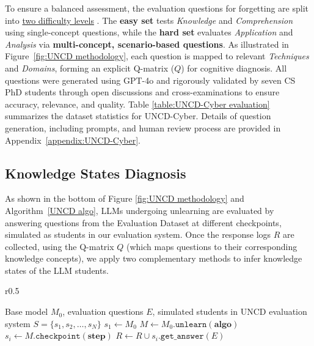 To ensure a balanced assessment, the evaluation questions for forgetting are split into \underline{two difficulty levels} \citep{forehand2010bloom}. The \textbf{easy set} tests \emph{Knowledge} and \emph{Comprehension} using single-concept questions, while the \textbf{hard set} evaluates \emph{Application} and \emph{Analysis} via \textbf{multi-concept, scenario-based questions}. As illustrated in Figure~\ref{fig:UNCD methodology}, each question is mapped to relevant \emph{Techniques} and \emph{Domains}, forming an explicit Q-matrix ($Q$) for cognitive diagnosis. All questions were generated using GPT-4o and rigorously validated by seven CS PhD students through open discussions and cross-examinations to ensure accuracy, relevance, and quality. Table \ref{table:UNCD-Cyber evaluation} summarizes the dataset statistics for UNCD-Cyber. Details of question generation, including prompts, and human review process are provided in Appendix~\ref{appendix:UNCD-Cyber}. 


\subsection{Knowledge States Diagnosis} \vspace{-0.05in}
\label{subsection: CDMs}
As shown in the bottom of Figure \ref{fig:UNCD methodology} and Algorithm~\ref{UNCD algo},  LLMs undergoing unlearning are evaluated by answering questions from the Evaluation Dataset at different checkpoints, simulated as students in our evaluation system. Once  the response logs \(R\) are collected, using the Q-matrix \(Q\) (which maps questions to their corresponding knowledge concepts), we apply two complementary methods to infer knowledge states of the LLM students. 

\begin{wrapfigure}{r}{0.5\textwidth}
 \vspace{-40pt}
  \begin{minipage}{0.5\textwidth}
    \begin{algorithm}[H]
    \small
    \caption{UNCD Response Logs Collection}
    \label{UNCD algo}
    \begin{algorithmic}[1]
    \Require Base model \(M_0\), evaluation questions \(E\), simulated students in UNCD evaluation system \(\displaystyle S = \{s_1, s_2, \dots, s_N\}\)
    \State \(s_1 \gets M_0\)
        \State \(M \gets M_0.\texttt{unlearn}(\textbf{algo})\)
            \State \(s_i \gets M.\texttt{checkpoint}(\textbf{step})\)
        \EndIf
    \EndFor
        \State \(R \gets R \cup s_i.\texttt{get\_answer}(E)\)
    \EndFor
    \end{algorithmic}
    \end{algorithm}
  \end{minipage}
  \vspace{-10pt}
\end{wrapfigure}

